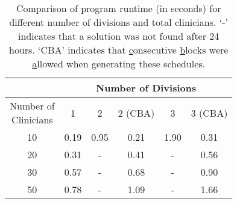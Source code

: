\begin{table}[htbp]
	\centering
	\begin{tabular}{|c|c||c|c||c|c|}
		\hline
		                                      & \multicolumn{5}{c|}{Number of Divisions} \\ \hline
		\makecell[l]{Number of \\ Clinicians} &  1   &  2   & 2 (CBA) &  3   &  3 (CBA)  \\ \hline
		                 10                   & 0.19 & 0.95 &  0.21   & 1.90 &   0.31    \\ \hline
		                 20                   & 0.31 &  -   &  0.41   &  -   &   0.56    \\ \hline
		                 30                   & 0.57 &  -   &  0.68   &  -   &   0.90    \\ \hline
		                 50                   & 0.78 &  -   &  1.09   &  -   &   1.66    \\ \hline
	\end{tabular}
	\caption{Comparison of program runtime (in seconds) for different number of divisions and total clinicians. `-' indicates that a solution was not found after 24 hours. `CBA' indicates that \underline{c}onsecutive \underline{b}locks were \underline{a}llowed when generating these schedules.}
	\label{tbl:runtime-divisions-comparison}%
\end{table}